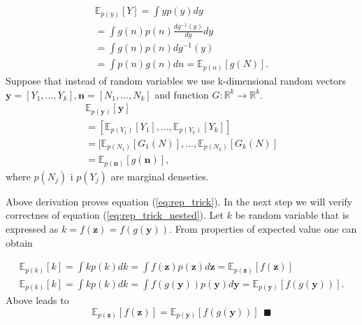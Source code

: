 \documentclass[10pt]{article}
\begin{document}
\begin{gather}
\mathbb{E}_{p(y)}[Y]=\int yp(y) dy \\
= \int g(n) p(n)\frac{dg^{-1}(y)}{dy}dy \\
= \int g(n) p(n) dg^{-1}(y) \\
=  \int p(n)  g(n) dn = \mathbb{E}_{p(n)}[g(N)].
\end{gather}
Suppose  that instead of random variables we use k-dimensional random vectors  $\textbf{y} = [ Y_1, ..., Y_k], \textbf{n} = [N_1, ..., N_k] $ and function $G : \mathbb{R}^k \to \mathbb{R}^k$.
\begin{gather}
    \mathbb{E}_{p(\textbf{y})}[\textbf{y}] \\
    = [ \mathbb{E}_{p(Y_{1})}[Y_{1}], ..., \mathbb{E}_{p(Y_{k})}[Y_{k}] ]\\
    =  [ \mathbb{E}_{p(N_{1})}[G_{1}(N)], ..., \mathbb{E}_{p(N_{k})}[G_{k}(N)] \\
    = \mathbb{E}_{p(\textbf{n})}[g(\textbf{n})],
\end{gather}
where  $p(N_{j})$ i $p(Y_{j})$ are marginal denseties. 

Above derivation proves equation (\ref{eq:rep_trick}).
In the next step we will verify correctnes of equation (\ref{eq:rep_trick_nested}). Let $k$ be random variable that is expressed as  $k = f(\textbf{z}) = f(g(\textbf{y}) )$. From properties of expected value one can obtain

\begin{gather}
    \mathbb{E}_{p(k)}[k] = \int k p(k) dk = \int f(\textbf{z}) p(\textbf{z}) d\textbf{z}
    = \mathbb{E}_{p(\textbf{z})}[f(\textbf{z})] \\
     \mathbb{E}_{p(k)}[k] = \int k p(k) dk = \int f(g(\textbf{y})) p(\textbf{y}) d\textbf{y}
    = \mathbb{E}_{p(\textbf{y})}[f(g(\textbf{y}))].
\end{gather}
Above leads to 
\begin{equation}
    \mathbb{E}_{p(\textbf{z})}[f(\textbf{z})] = \mathbb{E}_{p(\textbf{y})}[f(g(\textbf{y}))]   \ \ \blacksquare
\end{equation}
\end{document}
